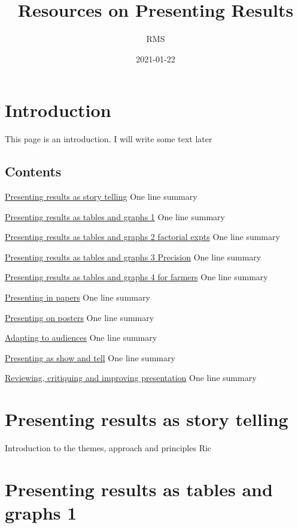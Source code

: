 \documentclass[
]{book}
\title{Resources on Presenting Results}
\author{RMS}
\date{2021-01-22}
\begin{document}
\maketitle

{
\setcounter{tocdepth}{1}
\tableofcontents
}
\hypertarget{introduction}{%
\chapter{Introduction}\label{introduction}}

This page is an introduction. I will write some text later

\hypertarget{contents}{%
\section{Contents}\label{contents}}

\protect\hyperlink{story}{Presenting results as story telling}
One line summary

\protect\hyperlink{tablegraph1}{Presenting results as tables and graphs 1}
One line summary

\protect\hyperlink{factor}{Presenting results as tables and graphs 2 factorial expts}
One line summary

\protect\hyperlink{precision}{Presenting results as tables and graphs 3 Precision}
One line summary

\protect\hyperlink{farmers}{Presenting results as tables and graphs 4 for farmers}
One line summary

\protect\hyperlink{papers}{Presenting in papers}
One line summary

\protect\hyperlink{posters}{Presenting on posters}
One line summary

\protect\hyperlink{audience}{Adapting to audiences}
One line summary

\protect\hyperlink{showandtell}{Presenting as show and tell}
One line summary

\protect\hyperlink{review}{Reviewing, critiquing and improving presentation}
One line summary

\hypertarget{story}{%
\chapter{Presenting results as story telling}\label{story}}

Introduction to the themes, approach and principles
Ric

\hypertarget{tablegraph1}{%
\chapter{Presenting results as tables and graphs 1}\label{tablegraph1}}
\end{document}
